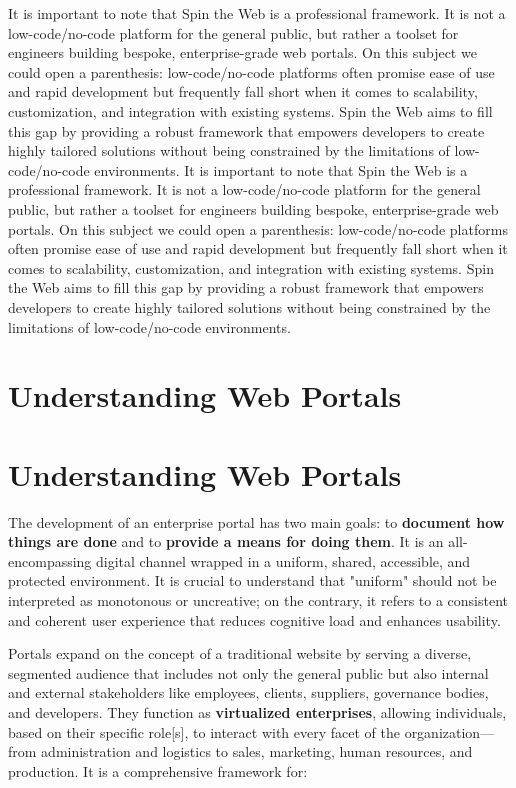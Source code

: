 It is important to note that Spin the Web is a professional framework. It is not a low-code/no-code platform for the general public, but rather a toolset for engineers building bespoke, enterprise-grade web portals. On this subject we could open a parenthesis: low-code/no-code platforms often promise ease of use and rapid development but frequently fall short when it comes to scalability, customization, and integration with existing systems. Spin the Web aims to fill this gap by providing a robust framework that empowers developers to create highly tailored solutions without being constrained by the limitations of low-code/no-code environments.
	It is important to note that Spin the Web is a professional framework. It is not a low-code/no-code platform for the general public, but rather a toolset for engineers building bespoke, enterprise-grade web portals. On this subject we could open a parenthesis: low-code/no-code platforms often promise ease of use and rapid development but frequently fall short when it comes to scalability, customization, and integration with existing systems. Spin the Web aims to fill this gap by providing a robust framework that empowers developers to create highly tailored solutions without being constrained by the limitations of low-code/no-code environments.

\section{Understanding Web Portals}
\section{Understanding Web Portals}
\label{sec:web-portals}

The development of an enterprise portal has two main goals: to \textbf{document how things are done} and to \textbf{provide a means for doing them}. It is an all-encompassing digital channel wrapped in a uniform, shared, accessible, and protected environment. It is crucial to understand that "uniform" should not be interpreted as monotonous or uncreative; on the contrary, it refers to a consistent and coherent user experience that reduces cognitive load and enhances usability.

Portals expand on the concept of a traditional website by serving a diverse, segmented audience that includes not only the general public but also internal and external stakeholders like employees, clients, suppliers, governance bodies, and developers. They function as \textbf{virtualized enterprises}, allowing individuals, based on their specific role[s], to interact with every facet of the organization—from administration and logistics to sales, marketing, human resources, and production. It is a comprehensive framework for:

